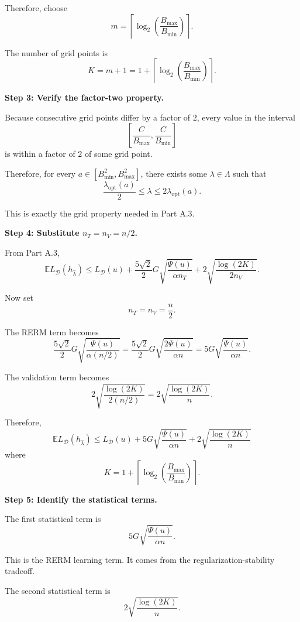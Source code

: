 \documentclass[11pt]{article}
\newcommand{\E}{\mathbb{E}}
\begin{document}
\begin{enumerate}
\begin{solutionbox}
Therefore, choose
\[
m
=
\left\lceil
\log_2\left(\frac{B_{\max}}{B_{\min}}\right)
\right\rceil.
\]

The number of grid points is
\[
K=m+1
=
1+
\left\lceil
\log_2\left(\frac{B_{\max}}{B_{\min}}\right)
\right\rceil.
\]

\medskip

\textbf{Step 3: Verify the factor-two property.}

Because consecutive grid points differ by a factor of $2$, every value in the interval
\[
\left[
\frac{C}{B_{\max}},
\frac{C}{B_{\min}}
\right]
\]
is within a factor of $2$ of some grid point.

Therefore, for every $a\in[B_{\min}^2,B_{\max}^2]$, there exists some $\lambda\in\Lambda$ such that
\[
\frac{\lambda_{\mathrm{opt}}(a)}{2}
\le
\lambda
\le
2\lambda_{\mathrm{opt}}(a).
\]

This is exactly the grid property needed in Part A.3.

\medskip

\textbf{Step 4: Substitute $n_T=n_V=n/2$.}

From Part A.3,
\[
\E L_{\mathcal D}(h_{\widehat\lambda})
\le
L_{\mathcal D}(u)
+
\frac{5\sqrt2}{2}
G
\sqrt{
\frac{\Psi(u)}
     {\alpha n_T}
}
+
2
\sqrt{
\frac{\log(2K)}
     {2n_V}
}.
\]

Now set
\[
n_T=n_V=\frac n2.
\]

The RERM term becomes
\[
\frac{5\sqrt2}{2}
G
\sqrt{
\frac{\Psi(u)}
     {\alpha(n/2)}
}
=
\frac{5\sqrt2}{2}
G
\sqrt{
\frac{2\Psi(u)}
     {\alpha n}
}
=
5G
\sqrt{
\frac{\Psi(u)}
     {\alpha n}
}.
\]

The validation term becomes
\[
2
\sqrt{
\frac{\log(2K)}
     {2(n/2)}
}
=
2
\sqrt{
\frac{\log(2K)}
     {n}
}.
\]

Therefore,
\[
\boxed{
\E L_{\mathcal D}(h_{\widehat\lambda})
\le
L_{\mathcal D}(u)
+
5G
\sqrt{
\frac{\Psi(u)}
     {\alpha n}
}
+
2
\sqrt{
\frac{\log(2K)}
     {n}
}
}
\]
where
\[
\boxed{
K
=
1+
\left\lceil
\log_2\left(\frac{B_{\max}}{B_{\min}}\right)
\right\rceil
}.
\]

\medskip

\textbf{Step 5: Identify the statistical terms.}

The first statistical term is
\[
5G
\sqrt{
\frac{\Psi(u)}
     {\alpha n}
}.
\]

This is the RERM learning term. It comes from the regularization-stability tradeoff.

The second statistical term is
\[
2
\sqrt{
\frac{\log(2K)}
     {n}
}.
\]


\end{solutionbox}
\end{enumerate}
\end{document}
